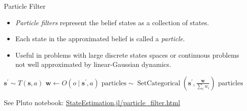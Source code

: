\begin{frame}[fragile]{Particle Filter}


\begin{itemize}
    \item \textit{Particle filters} represent the belief states as a collection of states.
    \item Each state in the approximated belief is called a \textit{particle}.
    \item Useful in problems with large discrete states spaces or continuous problems not well approximated by linear-Gaussian dynamics.
\end{itemize}

\begin{algorithm}[H]
    \caption{Particle filter algorithm.}
    \label{alg:particle_filter}
    \begin{algorithmic}
    \State $\mathbf{s}^\prime \sim T(\mathbf{s}, a)$ 
    \State $\mathbf{w} \leftarrow O(o \mid \mathbf{s}^\prime, a)$ 
    \State $\text{particles} \sim \operatorname{SetCategorical}\left(\mathbf{s}^\prime, \frac{\mathbf{w}}{\sum_i w_i}\right)$ 
    \State \Return $\text{particles}$
    \EndFunction
    \end{algorithmic}
\end{algorithm}

See Pluto notebook: \href{http://htmlview.glitch.me/?https://raw.githubusercontent.com/mossr/StateEstimation.jl/master/html/particle_filter.html}{\color{cardinal}StateEstimation.jl/particle\_filter.html}

\end{frame}